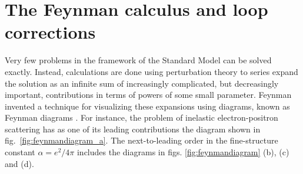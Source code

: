\documentclass[twoside,english]{uiofysmaster}
\begin{document}
\section{The Feynman calculus and loop corrections}
\label{subsec:feynmancalculus}
Very few problems in the framework of the Standard Model can be solved exactly. Instead, calculations are done using perturbation theory to series expand the solution as an infinite sum of increasingly complicated, but decreasingly important, contributions in terms of powers of some small parameter. Feynman invented a technique for visualizing these expansions using diagrams, known as Feynman diagrams \cite{2005AmericanScientist}. For instance, the problem of inelastic electron-positron scattering has as one of its leading contributions the diagram shown in fig.\ \ref{fig:feynmandiagram_a}. The next-to-leading order in the fine-structure constant $\alpha = e^2/4\pi$ includes the diagrams in figs. \ref{fig:feynmandiagram} (b), (c) and (d).
\end{document}

